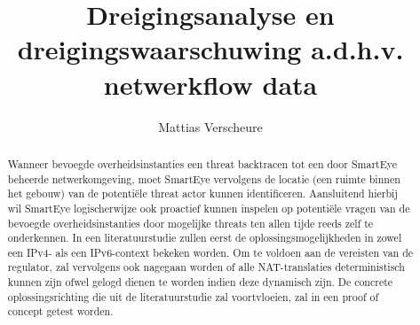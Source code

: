 \documentclass{hogent-article}
\title{Dreigingsanalyse en dreigingswaarschuwing a.d.h.v. netwerkflow data}
\author{Mattias Verscheure}
\begin{document}
\begin{abstract}
    Wanneer bevoegde overheidsinstanties een threat backtracen tot een door SmartEye beheerde netwerkomgeving, moet SmartEye vervolgens de locatie (een ruimte binnen het gebouw) van de potentiële threat actor kunnen identificeren. Aansluitend hierbij wil SmartEye logischerwijze ook proactief kunnen inspelen op potentiële vragen van de bevoegde overheidsinstanties door mogelijke threats ten allen tijde reeds zelf te onderkennen. In een literatuurstudie zullen eerst de oplossingsmogelijkheden in zowel een IPv4- als een IPv6-context bekeken worden. Om te voldoen aan de vereisten van de regulator, zal vervolgens ook nagegaan worden of alle NAT-translaties deterministisch kunnen zijn ofwel gelogd dienen te worden indien deze dynamisch zijn. De concrete oplossingsrichting die uit de literatuurstudie zal voortvloeien, zal in een proof of concept getest worden.
\end{abstract}

\tableofcontents



\printbibliography[heading=bibintoc]
\end{document}
